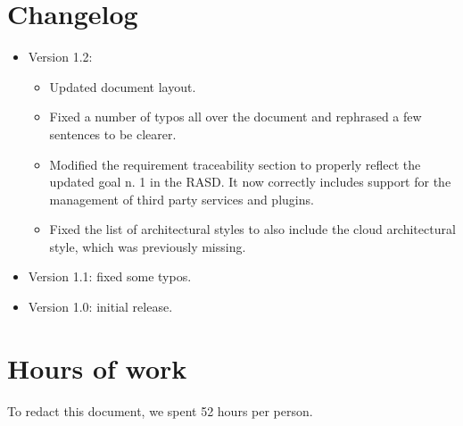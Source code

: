  \begin{appendices}

\chapter{Changelog}
\begin{itemize}
	\item Version 1.2:
	\begin{itemize}
		\item Updated document layout.
		\item Fixed a number of typos all over the document and rephrased a few sentences to be clearer.
		\item Modified the requirement traceability section to properly reflect the updated goal n. 1 in the RASD. It now correctly includes support for the management of third party services and plugins.
		\item Fixed the list of architectural styles to also include the cloud architectural style, which was previously missing.
	\end{itemize}
	\item Version 1.1: fixed some typos.
	\item Version 1.0: initial release.
\end{itemize}

\chapter{Hours of work}
To redact this document, we spent 52 hours per person.



\end{appendices}